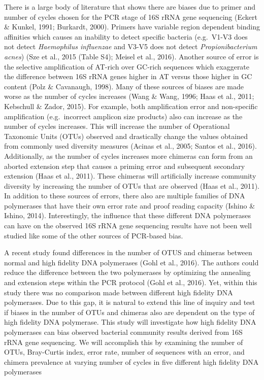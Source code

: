 \documentclass[11pt,]{article}
\begin{document}
There is a large body of literature that shows there are biases due to
primer and number of cycles chosen for the PCR stage of 16S rRNA gene
sequencing (Eckert \& Kunkel, 1991; Burkardt, 2000). Primers have
variable region dependent binding affinities which causes an inability
to detect specific bacteria (e.g.~V1-V3 does not detect
\emph{Haemophilus influenzae} and V3-V5 does not detect
\emph{Propionibacterium acnes}) (Sze et al., 2015 (Table S4); Meisel et
al., 2016). Another source of error is the selective amplification of
AT-rich over GC-rich sequences which exaggerate the difference between
16S rRNA genes higher in AT versus those higher in GC content (Polz \&
Cavanaugh, 1998). Many of these sources of biases are made worse as the
number of cycles increases (Wang \& Wang, 1996; Haas et al., 2011;
Kebschull \& Zador, 2015). For example, both amplification error and
non-specific amplification (e.g.~incorrect amplicon size products) also
can increase as the number of cycles increases. This will increase the
number of Operational Taxonomic Units (OTUs) observed and drastically
change the values obtained from commonly used diversity measures (Acinas
et al., 2005; Santos et al., 2016). Additionally, as the number of
cycles increases more chimeras can form from an aborted extension step
that causes a priming error and subsequent secondary extension (Haas et
al., 2011). These chimeras will artificially increase community
diversity by increasing the number of OTUs that are observed (Haas et
al., 2011). In addition to these sources of errors, there also are
multiple families of DNA polymerases that have their own error rate and
proof reading capacity (Ishino \& Ishino, 2014). Interestingly, the
influence that these different DNA polymerases can have on the observed
16S rRNA gene sequencing results have not been well studied like some of
the other sources of PCR-based bias.

A recent study found differences in the number of OTUS and chimeras
between normal and high fidelity DNA polymerases (Gohl et al., 2016).
The authors could reduce the difference between the two polymerases by
optimizing the annealing and extension steps within the PCR protocol
(Gohl et al., 2016). Yet, within this study there was no comparison made
between different high fidelity DNA polymerases. Due to this gap, it is
natural to extend this line of inquiry and test if biases in the number
of OTUs and chimeras also are dependent on the type of high fidelity DNA
polymerase. This study will investigate how high fidelity DNA
polymerases can bias observed bacterial community results derived from
16S rRNA gene sequencing. We will accomplish this by examining the
number of OTUs, Bray-Curtis index, error rate, number of sequences with
an error, and chimera prevalence at varying number of cycles in five
different high fidelity DNA polymerases
\end{document}
